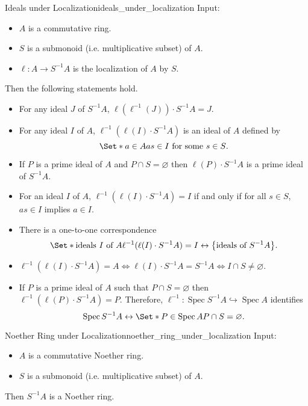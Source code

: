 \documentclass{article}
\begin{document}
\begin{proposition}{Ideals under Localization}{ideals_under_localization}
    Input:
    \begin{itemize}
        \item $A$ is a commutative ring.
        \item $S$ is a submonoid (i.e. multiplicative subset) of $A$.
        \item $\ell:A\rightarrow S^{-1}A$ is the localization of $A$ by $S$.
    \end{itemize}
    Then the following statements hold.
    \begin{itemize}
        \item For any ideal $J$ of $S^{-1}A$, $\ell(\ell^{-1}(J))\cdot S^{-1}A = J$.
        \item For any ideal $I$ of $A$, $\ell^{-1}(\ell(I)\cdot S^{-1}A)$ is an ideal of $A$ defined by
        \[ \Set*{a\in A}{as \in I \text{ for some } s\in S}. \]
        \item If $P$ is a prime ideal of $A$ and $P\cap S = \varnothing$ then $\ell(P)\cdot S^{-1}A$ is a prime ideal of $S^{-1}A$.
        \item For an ideal $I$ of $A$, $\ell^{-1}(\ell(I)\cdot S^{-1}A) = I$ if and only if for all $s\in S$, $as\in I$ implies $a\in I$.
        \item There is a one-to-one correspondence
        \[ \Set*{\text{ideals } I \text{ of } A }{ \ell^{-1}(\ell(I)\cdot S^{-1}A) = I} \leftrightarrow \qty{\text{ideals of } S^{-1}A}. \]
        \item $\ell^{-1}(\ell(I)\cdot S^{-1}A) = A \Longleftrightarrow \ell(I)\cdot S^{-1}A = S^{-1}A \Longleftrightarrow I\cap S \neq \varnothing$.
        \item If $P$ is a prime ideal of $A$ such that $P\cap S = \varnothing$ then $\ell^{-1}(\ell(P)\cdot S^{-1}A) = P$.
        Therefore, $\ell^{-1}: \operatorname{Spec} S^{-1}A \hookrightarrow \operatorname{Spec} A$ identifies
        \[ \operatorname{Spec} S^{-1}A \leftrightarrow \Set*{P\in \operatorname{Spec} A}{P\cap S = \varnothing}. \]
    \end{itemize}
\end{proposition}

\begin{theorem}{Noether Ring under Localization}{noether_ring_under_localization}
    Input:
    \begin{itemize}
        \item $A$ is a commutative Noether ring.
        \item $S$ is a submonoid (i.e. multiplicative subset) of $A$.
    \end{itemize}
    Then $S^{-1}A$ is a Noether ring.
\end{theorem}
\end{document}
